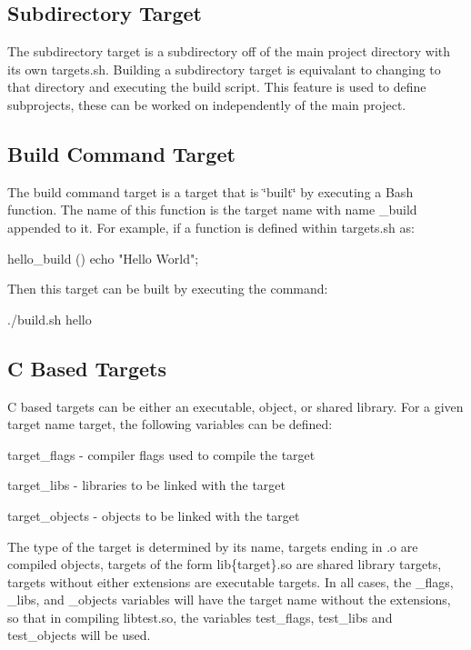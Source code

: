 \subsection*{Subdirectory Target }

The subdirectory target is a subdirectory off of the main project directory with its own {\ttfamily targets.\+sh}. Building a subdirectory target is equivalant to changing to that directory and executing the build script. This feature is used to define subprojects, these can be worked on independently of the main project.

\subsection*{Build Command Target }

The build command target is a target that is \char`\"{}built\char`\"{} by executing a Bash function. The name of this function is the target name with name {\ttfamily \+\_\+build} appended to it. For example, if a function is defined within {\ttfamily targets.\+sh} as\+: \begin{DoxyVerb}hello_build () { echo "Hello World"; }
\end{DoxyVerb}


Then this target can be built by executing the command\+: \begin{DoxyVerb}./build.sh hello
\end{DoxyVerb}


\subsection*{C Based Targets }

C based targets can be either an executable, object, or shared library. For a given target name {\ttfamily target}, the following variables can be defined\+:


\begin{DoxyItemize}
\item {\ttfamily target\+\_\+flags} -\/ compiler flags used to compile the target
\item {\ttfamily target\+\_\+libs} -\/ libraries to be linked with the target
\item {\ttfamily target\+\_\+objects} -\/ objects to be linked with the target
\end{DoxyItemize}

The type of the target is determined by its name, targets ending in {\ttfamily .o} are compiled objects, targets of the form {\ttfamily lib\{target\}.so} are shared library targets, targets without either extensions are executable targets. In all cases, the {\ttfamily \+\_\+flags}, {\ttfamily \+\_\+libs}, and {\ttfamily \+\_\+objects} variables will have the target name without the extensions, so that in compiling {\ttfamily libtest.\+so}, the variables {\ttfamily test\+\_\+flags}, {\ttfamily test\+\_\+libs} and {\ttfamily test\+\_\+objects} will be used.

